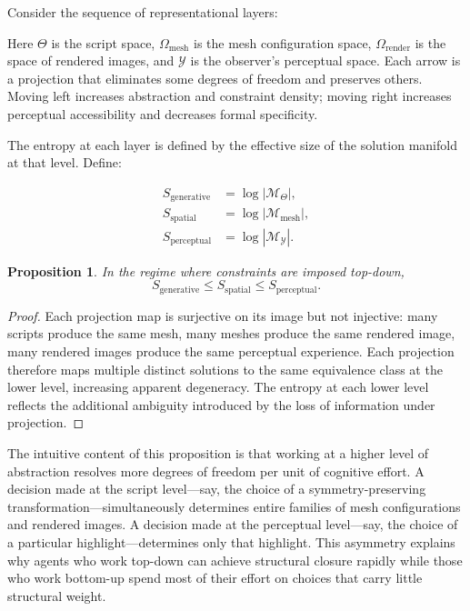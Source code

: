 \documentclass[11pt, twoside]{article}
\theoremstyle{plain}
\newtheorem{proposition}[theorem]{Proposition}
\theoremstyle{definition}
\theoremstyle{remark}
\begin{document}
Consider the sequence of representational layers:

\medskip
\begin{center}
\end{center}
\medskip

Here $\Theta$ is the script space, $\Omega_{\text{mesh}}$ is the mesh configuration space, $\Omega_{\text{render}}$ is the space of rendered images, and $\mathcal{Y}$ is the observer's perceptual space. Each arrow is a projection that eliminates some degrees of freedom and preserves others. Moving left increases abstraction and constraint density; moving right increases perceptual accessibility and decreases formal specificity.

The entropy at each layer is defined by the effective size of the solution manifold at that level. Define:

\begin{align*}
S_{\text{generative}} &= \log |\mathcal{M}_\Theta|, \\
S_{\text{spatial}} &= \log |\mathcal{M}_{\text{mesh}}|, \\
S_{\text{perceptual}} &= \log |\mathcal{M}_{\mathcal{Y}}|.
\end{align*}

\begin{proposition}
\label{prop:entropy-ordering}
In the regime where constraints are imposed top-down,
\[
S_{\text{generative}} \leq S_{\text{spatial}} \leq S_{\text{perceptual}}.
\]
\end{proposition}

\begin{proof}
Each projection map is surjective on its image but not injective: many scripts produce the same mesh, many meshes produce the same rendered image, many rendered images produce the same perceptual experience. Each projection therefore maps multiple distinct solutions to the same equivalence class at the lower level, increasing apparent degeneracy. The entropy at each lower level reflects the additional ambiguity introduced by the loss of information under projection.
\end{proof}

The intuitive content of this proposition is that working at a higher level of abstraction resolves more degrees of freedom per unit of cognitive effort. A decision made at the script level---say, the choice of a symmetry-preserving transformation---simultaneously determines entire families of mesh configurations and rendered images. A decision made at the perceptual level---say, the choice of a particular highlight---determines only that highlight. This asymmetry explains why agents who work top-down can achieve structural closure rapidly while those who work bottom-up spend most of their effort on choices that carry little structural weight.
\end{document}
